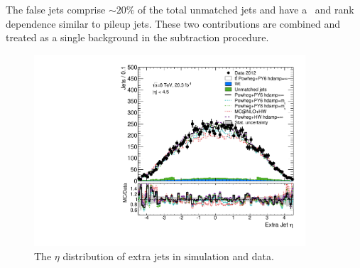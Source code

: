 The false jets comprise $\sim 20\%$ of the total unmatched jets and have a \pt\ and rank dependence similar to pileup jets. These two contributions are combined and treated as a single background in the subtraction procedure.
\begin{figure}
\centering
\includegraphics[width=0.9\textwidth]{fig/MCComp/NLO/ExtraJetEta.pdf}
\caption{The $\eta$ distribution of extra jets in simulation and data.}
\label{fig:jeteta}
\end{figure}

